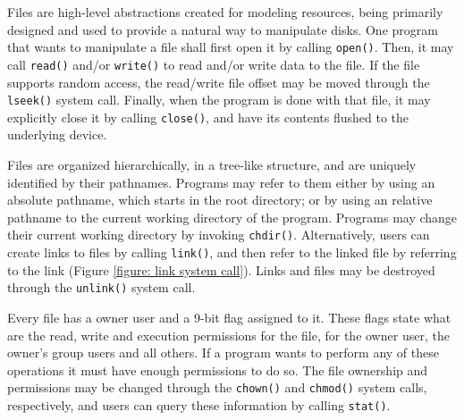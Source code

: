 \documentclass[10pt,a4paper]{article}
\begin{document}
Files are high-level abstractions created for modeling resources, being primarily designed and used to provide a natural way to manipulate disks. One program that wants to manipulate a file shall first open it by calling \texttt{open()}. Then, it may call \texttt{read()} and/or \texttt{write()} to read and/or write data to the file. If the file supports random access, the read/write file offset may be moved through the \texttt{lseek()} system call. Finally, when the program is done with that file, it may explicitly close it by calling \texttt{close()}, and have its contents flushed to the underlying device.

Files are organized hierarchically, in a tree-like structure, and are uniquely identified by their pathnames. Programs may refer to them either by using an absolute pathname, which starts in the root directory; or by using an relative pathname to the current working directory of the program. Programs may change their current working directory by invoking \texttt{chdir()}. Alternatively, users can create links to files by calling \texttt{link()}, and then refer to the linked file by referring to the link (Figure \ref{figure: link system call}). Links and files may be destroyed through the \texttt{unlink()} system call.

Every file has a owner user and a 9-bit flag assigned to it. These flags state what are the read, write and execution permissions for the file, for the owner user, the owner's group users and all others. If a program wants to perform any of these operations it must have enough permissions to do so. The file ownership and permissions may be changed through the \texttt{chown()} and \texttt{chmod()} system calls, respectively, and users can query these information by calling \texttt{stat()}.
\end{document}
